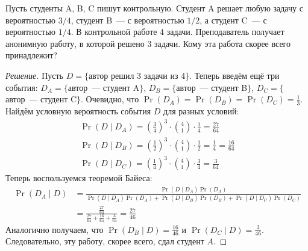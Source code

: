 \begin{problem}
    Пусть студенты A, B, C пишут контрольную. Студент A решает любую задачу с вероятностью \(3/4\), студент B~--- с вероятностью \(1/2\), а студент C~--- с вероятностью \(1/4\). В контрольной работе 4 задачи. Преподаватель получает анонимную работу, в которой решено 3 задачи. Кому эта работа скорее всего принадлежит?
\end{problem}
\begin{proof}[Решение]
    Пусть \(D = \{\)автор решил 3 задачи из 4\(\}\). Теперь введём ещё три события: \(D_A = \{\)автор~--- студент A\(\}\), \(D_B = \{\)автор~--- студент B\(\}\), \(D_C = \{\)автор~--- студент C\(\}\). Очевидно, что \(\Pr(D_A) = \Pr(D_B) = \Pr(D_C) = \frac{1}{3}\). Найдём условную вероятность события \(D\) для разных условий:
    \[\begin{array}{l}
    \Pr(D \mid D_A) = \left(\frac{3}{4}\right)^{3} \cdot \binom{4}{1} \cdot \frac{1}{4}  = \frac{27}{64} \\
    \Pr(D \mid D_B) = \left(\frac{1}{2}\right)^{3} \cdot \binom{4}{1} \cdot \frac{1}{2}  = \frac{1}{4} = \frac{16}{64} \\
    \Pr(D \mid D_C) = \left(\frac{1}{4}\right)^{3} \cdot \binom{4}{1} \cdot \frac{3}{4}  = \frac{3}{64}
    \end{array}\]
    Теперь воспользуемся теоремой Байеса:
    \[\begin{aligned}
    \Pr(D_A \mid D) &= \frac{\Pr(D \mid D_A)\Pr(D_A)}{\Pr(D \mid D_A)\Pr(D_A) + \Pr(D \mid D_B)\Pr(D_B) + \Pr(D \mid D_C)\Pr(D_C)} \\
    &= \frac{\frac{27}{64}}{\frac{27}{64} + \frac{16}{64} + \frac{3}{64}} = \frac{27}{46}
    \end{aligned}\]
    Аналогично получаем, что \(\Pr(D_B \mid D) = \frac{16}{46}\) и \(\Pr(D_C \mid D) = \frac{3}{46}\). Следовательно, эту работу, скорее всего, сдал студент \(A\).
\end{proof}

